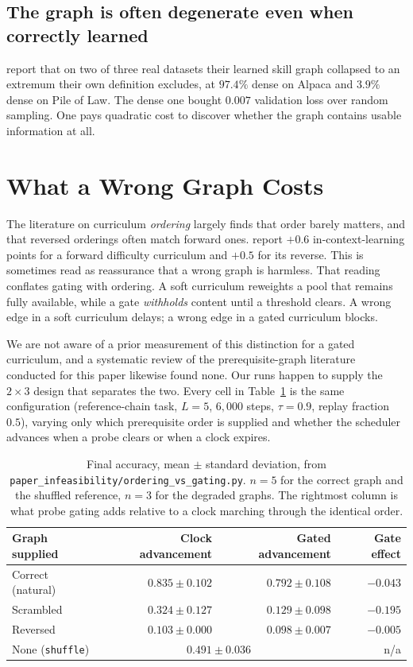 \documentclass[11pt]{article}
\theoremstyle{plain}
\theoremstyle{definition}
\theoremstyle{remark}
\begin{document}
\subsection{The graph is often degenerate even when correctly learned}

\citet{chen2023skillit} report that on two of three real datasets their learned
skill graph collapsed to an extremum their own definition excludes, at $97.4\%$
dense on Alpaca and $3.9\%$ dense on Pile of Law. The dense one bought $0.007$
validation loss over random sampling. One pays quadratic cost to discover whether
the graph contains usable information at all.

\section{What a Wrong Graph Costs}
\label{sec:wrong}

The literature on curriculum \emph{ordering} largely finds that order barely
matters, and that reversed orderings often match forward ones.
\citet{wettig2024qurating} report $+0.6$ in-context-learning points for a
forward difficulty curriculum and $+0.5$ for its reverse. This is sometimes read
as reassurance that a wrong graph is harmless. That reading conflates gating with
ordering. A soft curriculum reweights a pool that remains fully available, while
a gate \emph{withholds} content until a threshold clears. A wrong edge in a soft
curriculum delays; a wrong edge in a gated curriculum blocks.

We are not aware of a prior measurement of this distinction for a gated
curriculum, and a systematic review of the prerequisite-graph literature
conducted for this paper likewise found none. Our runs happen to supply the
$2 \times 3$ design that separates the two. Every cell in
Table~\ref{tab:wrongdag} is the same configuration (reference-chain task,
$L{=}5$, $6{,}000$ steps, $\tau = 0.9$, replay fraction $0.5$), varying only
which prerequisite order is supplied and whether the scheduler advances when a
probe clears or when a clock expires.

\begin{table}[ht]
\centering
\small
\begin{tabular}{@{}lrrr@{}}
\toprule
Graph supplied & Clock advancement & Gated advancement & Gate effect \\
\midrule
Correct (natural) & $\mathbf{0.835 \pm 0.102}$ & $0.792 \pm 0.108$ & $-0.043$ \\
Scrambled & $0.324 \pm 0.127$ & $0.129 \pm 0.098$ & $\mathbf{-0.195}$ \\
Reversed & $0.103 \pm 0.000$ & $0.098 \pm 0.007$ & $-0.005$ \\
\midrule
None (\texttt{shuffle}) & \multicolumn{2}{c}{$0.491 \pm 0.036$} & n/a \\
\bottomrule
\end{tabular}
\caption{Final accuracy, mean $\pm$ standard deviation, from
\texttt{paper\_infeasibility/ordering\_vs\_gating.py}. $n = 5$ for the correct
graph and the shuffled reference, $n = 3$ for the degraded graphs. The rightmost
column is what probe gating adds relative to a clock marching through the
identical order.}
\label{tab:wrongdag}
\end{table}
\end{document}
